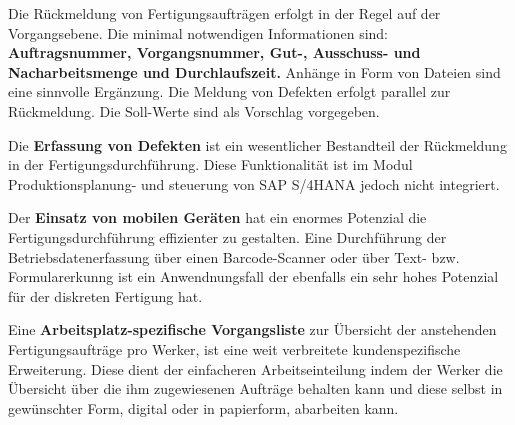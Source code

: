 \begin{definitionForm}[KA-P-6]
Die Rückmeldung von Fertigungsaufträgen erfolgt in der Regel auf der Vorgangsebene. Die minimal notwendigen Informationen sind: \textbf{Auftragsnummer, Vorgangsnummer, Gut-, Ausschuss- und Nacharbeitsmenge und Durchlaufszeit.}
Anhänge in Form von Dateien sind eine sinnvolle Ergänzung. Die Meldung von Defekten erfolgt parallel zur Rückmeldung. 
Die Soll-Werte sind als Vorschlag vorgegeben.
\end{definitionForm}

\begin{definitionForm}[KA-P-7]
Die \textbf{Erfassung von Defekten} ist ein wesentlicher Bestandteil der Rückmeldung in der Fertigungsdurchführung. Diese Funktionalität ist im Modul Produktionsplanung- und steuerung von SAP S/4HANA jedoch nicht integriert.
\end{definitionForm}

\begin{definitionForm}[KA-P-8]
Der \textbf{Einsatz von mobilen Geräten} hat ein enormes Potenzial die Fertigungsdurchführung effizienter zu gestalten. Eine Durchführung der Betriebsdatenerfassung über einen Barcode-Scanner oder über Text- bzw. Formularerkunng ist ein Anwendnungsfall der ebenfalls ein sehr hohes Potenzial für der diskreten Fertigung hat.
\end{definitionForm}

\begin{definitionForm}[KA-P-9]
Eine \textbf{Arbeitsplatz-spezifische Vorgangsliste} zur Übersicht der anstehenden Fertigungsaufträge pro Werker, ist eine weit verbreitete kundenspezifische Erweiterung. Diese dient der einfacheren Arbeitseinteilung indem der Werker die Übersicht über die ihm zugewiesenen Aufträge behalten kann und diese selbst in gewünschter Form, digital oder in papierform, abarbeiten kann.
\end{definitionForm}